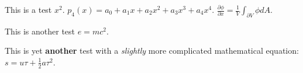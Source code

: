 \documentclass[border=0bp,varwidth]{standalone}
\begin{document}
This is a test $x^2$. $p_4(x) = a_0 + a_1x + a_2x^2 + a_3x^3 + a_4x^4$. $\frac{\partial\phi}{\partial x} = \frac{1}{V}\int_{\partial V} \phi dA$.

This is another test $e = mc^2$.

This is yet \textbf{another} test with a \textit{slightly} more complicated mathematical equation: $s = u\tau + \frac{1}{2}a\tau^2$.
\end{document}
